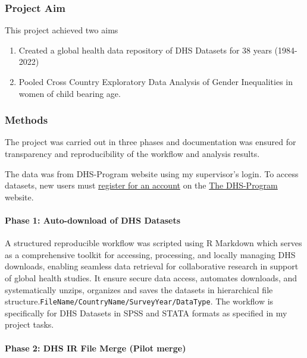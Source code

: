 \documentclass[
]{article}
\providecommand{\tightlist}{%
  \setlength{\itemsep}{0pt}\setlength{\parskip}{0pt}}
\begin{document}
\subsubsection{Project Aim}\label{project-aim}

This project achieved two aims

\begin{enumerate}
\def\labelenumi{\arabic{enumi}.}
\tightlist
\item
  Created a global health data repository of DHS Datasets for 38 years
  (1984-2022)
\item
  Pooled Cross Country Exploratory Data Analysis of Gender Inequalities
  in women of child bearing age.
\end{enumerate}

\subsubsection{Methods}\label{methods}

The project was carried out in three phases and documentation was
ensured for transparency and reproducibility of the workflow and
analysis results.

The data was from DHS-Program website using my supervisor's login. To
access datasets, new users must
\href{https://dhsprogram.com/data/new-user-registration.cfm}{register
for an account} on the \href{https://dhsprogram.com}{The DHS-Program}
website.

\paragraph{Phase 1: Auto-download of DHS
Datasets}\label{phase-1-auto-download-of-dhs-datasets}

A structured reproducible workflow was scripted using R Markdown which
serves as a comprehensive toolkit for accessing, processing, and locally
managing DHS downloads, enabling seamless data retrieval for
collaborative research in support of global health studies. It ensure
secure data access, automates downloads, and systematically unzips,
organizes and saves the datasets in hierarchical file
structure.\texttt{FileName/CountryName/SurveyYear/DataType}. The
workflow is specifically for DHS Datasets in SPSS and STATA formats as
specified in my project tasks.

\paragraph{Phase 2: DHS IR File Merge (Pilot
merge)}\label{phase-2-dhs-ir-file-merge-pilot-merge}
\end{document}
